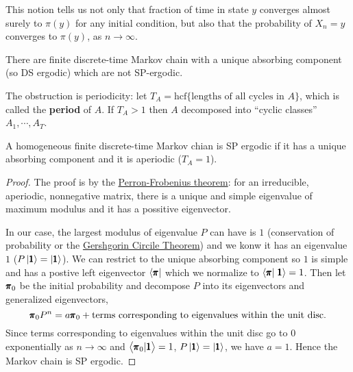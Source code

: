 \begin{remark}
    This notion tells us not only that fraction of time in state $y$ converges almost surely to $\pi(y)$ for any initial condition, but also that the probability of $X_n = y$ converges to $\pi(y)$, as $n \to \infty$.
\end{remark}

\begin{remark}
    There are finite discrete-time Markov chain with a unique absorbing component (so DS ergodic) which are not SP-ergodic. 
    
    The obstruction is periodicity: let $T_A = \text{hcf} \{ \text{lengths of all cycles in $A$} \}$, which is called the \textbf{\textcolor{myblue}{period}} of $A$. If $T_A > 1$ then $A$ decomposed into ``cyclic classes'' $A_1, \cdots ,A_T$.
\end{remark}

\begin{theorem}
    A homogeneous finite discrete-time Markov chian is SP ergodic if it has a unique absorbing component and it is aperiodic ($T_A = 1$).
\end{theorem}
\begin{proof}
    The proof is by the \href{https://en.wikipedia.org/wiki/Perron%E2%80%93Frobenius_theorem}{Perron-Frobenius theorem}: for an irreducible, aperiodic, nonnegative matrix, there is a unique and simple eigenvalue of maximum modulus and it has a possitive eigenvector.

    In our case, the largest modulus of eigenvalue $P$ can have is $1$ (conservation of probability or the \href{https://en.wikipedia.org/wiki/Gershgorin_circle_theorem}{Gershgorin Circile Theorem}) and we konw it has an eigenvalue $1$ ($P \left| \pmb{1} \right> = \left| \pmb{1} \right>$). We can restrict to the unique absorbing component so $1$ is simple and has a postive left eigenvector $\left< \pmb{\pi} \right|$ which we normalize to $\left< \pmb{\pi} \right| \left. \pmb{1} \right> = 1$. Then let $\pmb{\pi}_0$ be the initial probability and decompose $P$ into its eigenvectors and generalized eigenvectors,
    \begin{equation*}
        \pmb{\pi}_0 P^n = a \pmb{\pi}_0 + \text{terms corresponding to eigenvalues within the unit disc}.
    \end{equation*}
    Since terms corresponding to eigenvalues within the unit disc go to $0$ exponentially as $n \to \infty$ and $\left< \pmb{\pi}_0 | \pmb{1} \right> = 1$, $P \left| \pmb{1} \right> = \left| \pmb{1} \right>$, we have $a = 1$. Hence the Markov chain is SP ergodic.
\end{proof}

